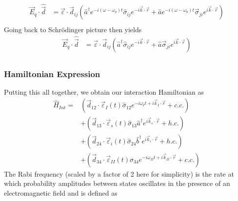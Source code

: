 \documentclass[aps,pra,showpacs,amsmath,amssymb,nofootinbib,longbibliography,superscriptaddress
]{revtex4-1}
\theoremstyle{definition}
\theoremstyle{remark}
\newcommand{\0}{\hat{0}}
\begin{document}
\begin{align}
    \vec{E}_q \cdot \hat{\vec{d}} &=
    \vec{\varepsilon} \cdot \vec{d}_{ij}\left(
        \hat{a}^{\dagger} e^{-i (\omega - \omega_0) t} \hat{\sigma}_{ij} e^{-i \vec{k} \cdot \vec{r}} +
        \hat{a} e^{-i (\omega - \omega_0) t}\vec{\sigma}_{ji} e^{i \vec{k} \cdot \vec{r}}
    \right) \nonumber \\
\end{align}
Going back to Schr\"{o}dinger picture then yields
\begin{align}
    \vec{E}_q \cdot \hat{\vec{d}} &=
    \vec{\varepsilon} \cdot \vec{d}_{ij}\left(
        \hat{a}^{\dagger} \hat{\sigma}_{ij} e^{-i \vec{k} \cdot \vec{r}} +
        \hat{a} \vec{\sigma}_{ji} e^{i \vec{k} \cdot \vec{r}}
    \right) \\
\end{align}

\subsubsection{Hamiltonian Expression}

Putting this all together, we obtain our interaction Hamiltonian as
\begin{align}
    \hat{H}_{Int} = &\left(\vec{d}_{12} \cdot \vec{\varepsilon}_I(t) \hat{\sigma}_{12} e^{-i \omega_I t + i \vec{k}_I \cdot \vec{r}} + c.c.\right)\nonumber \\
    &+ \left(\vec{d}_{13} \cdot \vec{\varepsilon}_{s}(t) \hat{\sigma}_{13} \hat{a}^{\dagger} e^{i \vec{k}_{s} \cdot \vec{r}} + h.c.\right)\nonumber \\
    &+ \left(\vec{d}_{24} \cdot \vec{\varepsilon}_{i}(t) \hat{\sigma}_{24} \hat{b}^{\dagger} e^{i \vec{k}_{i} \cdot \vec{r}} + h.c.\right)\nonumber \\
    &+ \left(\vec{d}_{34} \cdot \vec{\varepsilon}_{II}(t) \hat{\sigma}_{34} e^{-i \omega_{II} t + i \vec{k}_{II} \cdot \vec{r}} + c.c.\right)
\end{align}
The Rabi frequency (scaled by a factor of 2 here for simplicity) is the rate at which probability amplitudes between states oscillates in the presence of an electromagnetic field \cite{TODO} and is defined as
\end{document}
